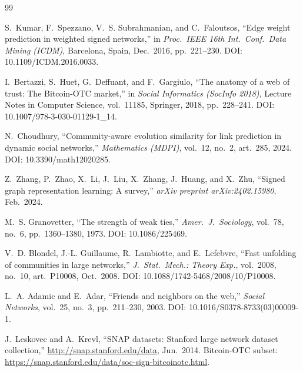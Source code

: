 \documentclass[conference]{IEEEtran}
\begin{document}
\begin{thebibliography}{99}

S.~Kumar, F.~Spezzano, V.~S. Subrahmanian, and C.~Faloutsos,
``Edge weight prediction in weighted signed networks,''
in \emph{Proc.\ IEEE 16th Int.\ Conf.\ Data Mining (ICDM)},
Barcelona, Spain, Dec.\ 2016, pp.\ 221--230.
DOI: 10.1109/ICDM.2016.0033.

I.~Bertazzi, S.~Huet, G.~Deffuant, and F.~Gargiulo,
``The anatomy of a web of trust: The Bitcoin-OTC market,''
in \emph{Social Informatics (SocInfo 2018)},
Lecture Notes in Computer Science, vol.\ 11185, Springer, 2018,
pp.\ 228--241.
DOI: 10.1007/978-3-030-01129-1\_14.

N.~Choudhury,
``Community-aware evolution similarity for link prediction in dynamic
social networks,''
\emph{Mathematics (MDPI)}, vol.\ 12, no.\ 2, art.\ 285, 2024.
DOI: 10.3390/math12020285.

Z.~Zhang, P.~Zhao, X.~Li, J.~Liu, X.~Zhang, J.~Huang, and X.~Zhu,
``Signed graph representation learning: A survey,''
\emph{arXiv preprint arXiv:2402.15980}, Feb.\ 2024.

M.~S. Granovetter,
``The strength of weak ties,''
\emph{Amer.\ J.\ Sociology}, vol.\ 78, no.\ 6, pp.\ 1360--1380, 1973.
DOI: 10.1086/225469.

V.~D. Blondel, J.-L. Guillaume, R.~Lambiotte, and E.~Lefebvre,
``Fast unfolding of communities in large networks,''
\emph{J.\ Stat.\ Mech.: Theory Exp.}, vol.\ 2008, no.\ 10, art.\ P10008,
Oct.\ 2008. DOI: 10.1088/1742-5468/2008/10/P10008.

L.~A. Adamic and E.~Adar,
``Friends and neighbors on the web,''
\emph{Social Networks}, vol.\ 25, no.\ 3, pp.\ 211--230, 2003.
DOI: 10.1016/S0378-8733(03)00009-1.


J.~Leskovec and A.~Krevl,
``SNAP datasets: Stanford large network dataset collection,''
\url{http://snap.stanford.edu/data}, Jun.\ 2014.
Bitcoin-OTC subset:
\url{https://snap.stanford.edu/data/soc-sign-bitcoinotc.html}.

\end{thebibliography}
\end{document}
